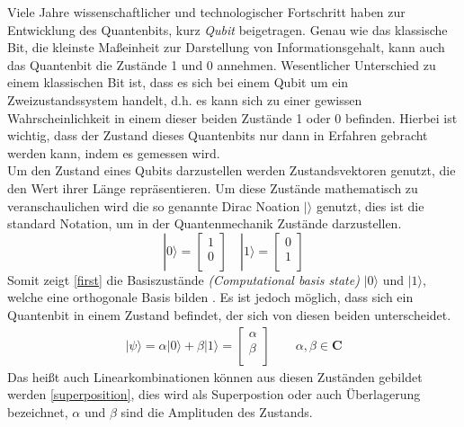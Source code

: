 Viele Jahre wissenschaftlicher und technologischer Fortschritt haben zur Entwicklung des Quantenbits, kurz \textit{Qubit} beigetragen. Genau wie das klassische Bit, die kleinste Ma\ss einheit zur Darstellung von Informationsgehalt, kann auch das Quantenbit die Zust\"ande 1 und 0 annehmen. Wesentlicher Unterschied zu einem klassischen Bit ist, dass es sich bei einem Qubit um ein Zweizustandssystem handelt, d.h. es kann sich zu einer gewissen Wahrscheinlichkeit in einem dieser beiden Zust\"ande 1 oder 0 befinden. Hierbei ist wichtig, dass der Zustand dieses Quantenbits nur dann in Erfahren gebracht werden kann, indem es gemessen wird.\\
Um den Zustand eines Qubits darzustellen werden Zustandsvektoren genutzt, die den Wert ihrer L\"ange repr\"asentieren. Um diese Zust\"ande mathematisch zu veranschaulichen wird die so genannte Dirac Noation $|\rangle$ genutzt, dies ist die standard Notation, um in der Quantenmechanik Zust\"ande darzustellen.
\begin{equation} \label{first}
        |0\rangle = \begin{bmatrix}
        1 \\
        0 \\
        \end{bmatrix}
        \,\,\, \,\,\,
        |1\rangle = \begin{bmatrix}
        0 \\
        1 \\
        \end{bmatrix}
\end{equation}
Somit zeigt \ref{first} die Basiszust\"ande \textit{(Computational basis state)} $|0\rangle$ und $|1\rangle$, welche eine orthogonale Basis bilden \cite{nielsen_chuang_2010}. Es ist jedoch m\"oglich, dass sich ein Quantenbit in einem Zustand befindet, der sich von diesen beiden unterscheidet.
\begin{equation}\label{superposition}
\begin{gathered}
        |\psi\rangle = \alpha |0\rangle+\beta |1\rangle = \begin{bmatrix}
        \alpha \\
        \beta \\
        \end{bmatrix} \qquad \alpha, \beta \in \mathbf{C}
        \end{gathered}
\end{equation}
Das hei\ss t auch Linearkombinationen k\"onnen aus diesen Zust\"anden gebildet werden \ref{superposition}, dies wird als Superpostion oder auch \"Uberlagerung bezeichnet, $\alpha$ und $\beta$ sind die Amplituden des Zustands. \\
